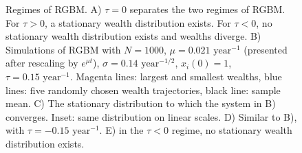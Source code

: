 \begin{figure}[!htb]
\caption{Regimes of RGBM. A) $\tau=0$ separates the two regimes of RGBM. For $\tau>0$, a stationary wealth distribution exists. For $\tau<0$, no stationary wealth distribution exists and wealths diverge. B) Simulations of RGBM with $N=1000$, $\mu=0.021 \text{ year}^{-1}$ (presented after rescaling by $e^{\mu t}$), $\sigma=0.14\text{ year}^{-1/2}$, $x_i\left(0\right)=1$, $\tau=0.15 \text{ year}^{-1}$. Magenta lines: largest and smallest wealths, blue lines: five randomly chosen wealth trajectories, black line: sample mean. C) The stationary distribution to which the system in B) converges. Inset: same distribution on linear scales. D) Similar to B), with $\tau=-0.15 \text{ year}^{-1}$. E) in the $\tau<0$ regime, no stationary wealth distribution exists.}
\end{figure}


